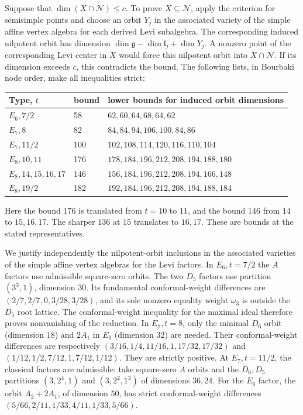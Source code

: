 \documentclass[11pt,a4paper]{amsart}
\numberwithin{equation}{section}
\theoremstyle{definition}
\theoremstyle{remark}
\newcommand{\g}{\mathfrak g}
\newcommand{\lev}{\mathfrak l}
\newcommand{\N}{\mathcal N}
\begin{document}
Suppose that $\dim(X\cap\N)\le c$. To prove $X\subseteq\N$, apply
the criterion for semisimple points and choose an orbit $Y_j$ in the
associated variety of the simple affine vertex algebra for each derived
Levi subalgebra. The corresponding induced nilpotent orbit has dimension
$\dim\g-\dim\lev_j+\dim Y_j$. A nonzero point of the corresponding
Levi center in $X$ would force this nilpotent orbit into $X\cap\N$.
If its dimension exceeds $c$, this contradicts the bound.
The following lists, in Bourbaki node order, make all inequalities strict:
\begin{center}\small
\begin{tabular}{@{}llp{}@{}}\toprule
Type, $t$&bound&lower bounds for induced orbit dimensions\\\midrule
$E_6,7/2$&58&$62,60,64,68,64,62$\\
$E_7,8$&82&$84,84,94,106,100,84,86$\\
$E_7,11/2$&100&$102,108,114,120,116,110,104$\\
$E_8,10,11$&176&$178,184,196,212,208,194,188,180$\\
$E_8,14,15,16,17$&$146$&$156,184,196,212,208,194,166,148$\\
$E_8,19/2$&182&$192,184,196,212,208,194,188,184$\\\bottomrule
\end{tabular}\end{center}
Here the bound $176$ is translated from $t=10$ to $11$, and the bound $146$
from $14$ to $15,16,17$. The sharper $136$ at $15$ translates to $16,17$.
These are bounds at the stated representatives.

We justify independently the nilpotent-orbit inclusions in the associated
varieties of the simple affine vertex algebras for the Levi factors.
In $E_6,t=7/2$ the $A$ factors use admissible square-zero
orbits. The two $D_5$ factors use partition $(3^3,1)$, dimension $30$.
Its fundamental conformal-weight differences are
$(2/7,2/7,0,3/28,3/28)$, and its sole nonzero equality weight
$\omega_3$ is outside the $D_5$ root lattice. The conformal-weight inequality for the maximal ideal therefore proves nonvanishing of the reduction. In $E_7,t=8$, only the minimal
$D_6$ orbit (dimension $18$) and $2A_1$ in $E_6$ (dimension $32$)
are needed. Their conformal-weight differences are respectively
$
 (3/16,1/4,11/16,1,17/32,17/32)$ and 
 $(1/12,1/2,7/12,1,7/12,1/12).$ 
They are strictly positive. At $E_7,t=11/2$, the classical factors are
admissible: take square-zero $A$ orbits and the $D_6,D_5$ partitions
$(3,2^4,1)$ and $(3,2^2,1^3)$ of dimensions $36,24$.
For the $E_6$ factor, the orbit $A_2+2A_1$, of dimension $50$, has strict conformal-weight differences
$(5/66,2/11,1/33,4/11,1/33,5/66)$.
\end{document}
